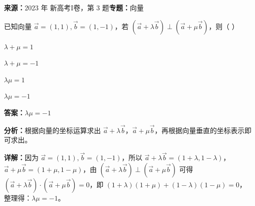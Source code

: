 \begin{question}[points=5]
\textbf{来源：}2023 年 新高考I卷，第 3 题\quad \textbf{专题：}向量\par
已知向量 $\vec{a}=(1,1),\vec{b}=(1,-1)$，若 $(\vec{a}+\lambda\vec{b})\perp(\vec{a}+\mu\vec{b})$，则（ ）
\begin{choices}
  \item $\lambda+\mu=1$
  \item $\lambda+\mu=-1$
  \item $\lambda\mu=1$
  \item $\lambda\mu=-1$
\end{choices}
\begin{solution}
\textbf{答案：}$\lambda\mu=-1$

\textbf{分析：}根据向量的坐标运算求出 $\vec{a}+\lambda\vec{b}$，$\vec{a}+\mu\vec{b}$，再根据向量垂直的坐标表示即可求出。

\textbf{详解：}因为 $\vec{a}=(1,1),\vec{b}=(1,-1)$，所以 $\vec{a}+\lambda\vec{b}=(1+\lambda,1-\lambda)$，$\vec{a}+\mu\vec{b}=(1+\mu,1-\mu)$，由 $(\vec{a}+\lambda\vec{b})\perp(\vec{a}+\mu\vec{b})$ 可得 $(\vec{a}+\lambda\vec{b})\cdot(\vec{a}+\mu\vec{b})=0$，即 $(1+\lambda)(1+\mu)+(1-\lambda)(1-\mu)=0$，整理得：$\lambda\mu=-1$。
\end{solution}
\end{question}

